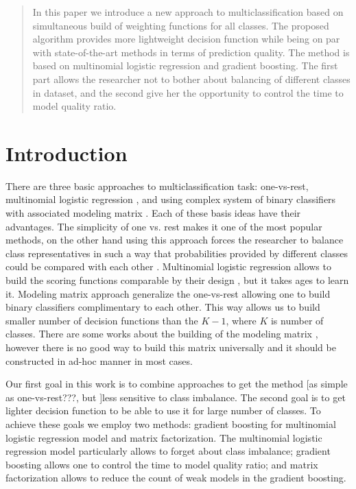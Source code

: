 \documentclass{article}
\begin{document}
\begin{abstract} 
In this paper we introduce a new approach to multiclassification based on simultaneous build of weighting functions for all classes. The proposed algorithm provides more lightweight decision function while being on par with state-of-the-art methods in terms of prediction quality. The method is based on multinomial logistic regression and gradient boosting. The first part allows the researcher not to bother about balancing of different classes in dataset, and the second give her the opportunity to control the time to model quality ratio.
\end{abstract} 

\section{Introduction}
\label{introduction}
There are three basic approaches to multiclassification task: one-vs-rest, multinomial logistic regression \cite{GLM}, and using complex system of binary classifiers with associated modeling matrix \cite{Allwein00reducingmulticlass}. Each of these basis ideas have their advantages. The simplicity of one vs. rest makes it one of the most popular methods, on the other hand using this approach forces the researcher to balance class representatives in such a way that probabilities provided by different classes could be compared with each other \cite{imbalancing_classes1, imbalancing_classes2}. Multinomial logistic regression allows to build the scoring functions comparable by their design \cite{mlr_imbalancing}, but it takes ages to learn it. Modeling matrix approach generalize the one-vs-rest allowing one to build binary classifiers complimentary to each other. This way allows us to build smaller number of decision functions than the $K-1$, where $K$ is number of classes. There are some works about the building of the modeling matrix \cite{Zhao_sparseoutput, modelmatrix2}, however there is no good way to build this matrix universally and it should be constructed in ad-hoc manner in most cases.

Our first goal in this work is to combine approaches to get the method [as simple as one-vs-rest???, but ]less sensitive to class imbalance. The second goal is to get lighter decision function to be able to use it for large number of classes. To achieve these goals we employ two methods: gradient boosting for multinomial logistic regression model and matrix factorization. The multinomial logistic regression model particularly allows to forget about class imbalance; gradient boosting allows one to control the time to model quality ratio; and matrix factorization allows to reduce the count of weak models in the gradient boosting.
\end{document}
